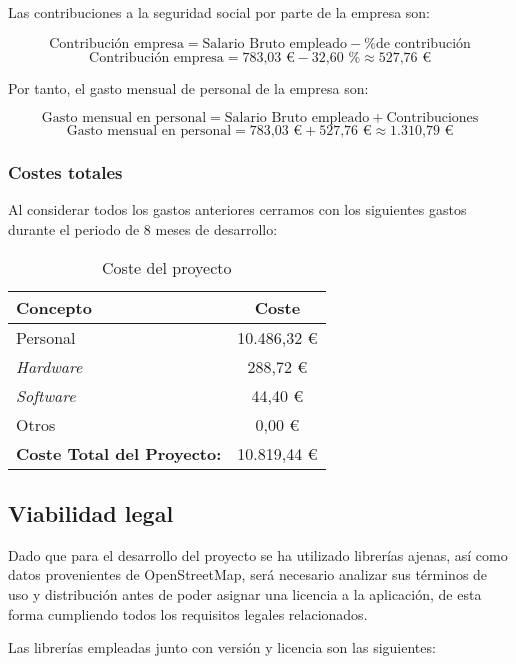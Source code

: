 Las contribuciones a la seguridad social por parte de la empresa son:

\[
\text{Contribución empresa} = \text{Salario Bruto empleado} - \text{\% de contribución}
\]
\[
\text{Contribución empresa} = \text{783,03 €} - \text{32,60 \%} \approx \text{527,76 €}
\]

Por tanto, el gasto mensual de personal de la empresa son:

\[
\text{Gasto mensual en personal} = \text{Salario Bruto empleado} + \text{Contribuciones}
\]
\[
\text{Gasto mensual en personal} = \text{783,03 €} + \text{527,76 €} \approx \text{1.310,79 €}
\]

\subsubsection{Costes totales}
Al considerar todos los gastos anteriores cerramos con los siguientes gastos durante el periodo de 8 meses de desarrollo:

\begin{table}[h!]
	\centering
	\begin{tabular}{| l | c |}
		\toprule
		\textbf{Concepto} & \textbf{Coste} \\ \midrule
		Personal & 10.486,32 €\\
		\textit{Hardware} & 288,72  € \\
		\textit{Software} & 44,40 €\\
		Otros & 0,00 €\\
		
		\midrule
		\textbf{Coste Total del Proyecto:} & 10.819,44  € \\
		\bottomrule
	\end{tabular}
	\caption{Coste del proyecto}
	\label{Costproject}
\end{table}

\subsection{Viabilidad legal}

Dado que para el desarrollo del proyecto se ha utilizado librerías ajenas, así como datos provenientes de OpenStreetMap, será necesario analizar sus términos de uso y distribución antes de poder asignar una licencia a la aplicación, de esta forma cumpliendo todos los requisitos legales relacionados.

Las librerías empleadas junto con versión y licencia son las siguientes:


